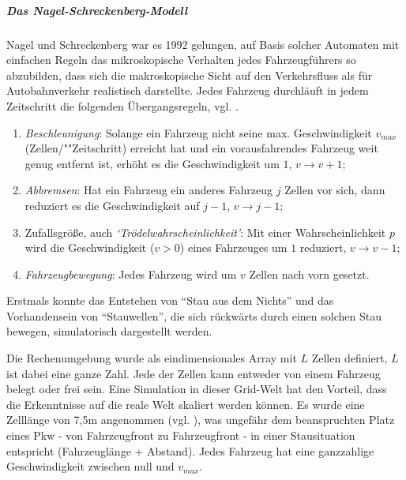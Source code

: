 \subparagraph{Das Nagel-Schreckenberg-Modell}

Nagel und Schreckenberg war es 1992 gelungen, auf Basis solcher Automaten mit einfachen Regeln das mikroskopische Verhalten jedes Fahr\-zeug\-füh\-rers so abzubilden, dass sich die makroskopische Sicht auf den Verkehrsfluss als für Autobahnverkehr realistisch darstellte. 
Jedes Fahrzeug durchläuft in jedem Zeitschritt die folgenden Übergangsregeln, vgl. \cite{na-sch}. 

\begin{enumerate}
	\item \textit{Beschleunigung}: Solange ein Fahrzeug nicht seine max. Geschwindigkeit $v_{max}$ (Zellen/""Zeitschritt) erreicht hat und ein vorausfahrendes Fahrzeug weit genug entfernt ist, erhöht es die Geschwindigkeit um $1$, $v \rightarrow v+1$;
	\item \textit{Abbremsen}: Hat ein Fahrzeug ein anderes Fahrzeug $j$ Zellen vor sich, dann reduziert es die Geschwindigkeit auf $j-1$, $v \rightarrow j-1$;
	\item Zufallsgröße, auch \textit{\enquote*{Trödelwahrscheinlichkeit}}: Mit einer Wahrscheinlichkeit $p$ wird die Geschwindigkeit ($v > 0$) eines Fahrzeuges um $1$ reduziert, $v \rightarrow v-1$;
	\item \textit{Fahrzeugbewegung}: Jedes Fahrzeug wird um $v$ Zellen nach vorn gesetzt.
\end{enumerate}

\noindent
Erstmals konnte das Entstehen von \enquote{Stau aus dem Nichts} und das Vorhandensein von \enquote{Stauwellen}, die sich rückwärts durch einen solchen Stau bewegen, simulatorisch dargestellt werden.

Die Rechenumgebung wurde als eindimensionales Array mit $L$ Zellen definiert, $L$ ist dabei eine ganze Zahl. 
Jede der Zellen kann entweder von einem Fahrzeug belegt oder frei sein. 
Eine Simulation in dieser Grid-Welt hat den Vorteil, dass die Erkenntnisse auf die reale Welt skaliert werden können. 
Es wurde eine Zelllänge von 7,5\nolinebreak[4] m angenommen (vgl. \cite[S. 2227]{na-sch}), was ungefähr dem beanspruchten Platz eines Pkw - von Fahrzeugfront zu Fahrzeugfront - in einer Stausituation entspricht (Fahrzeuglänge + Abstand). 
Jedes Fahrzeug hat eine ganzzahlige Geschwindigkeit zwischen null und $v_{max}$.

